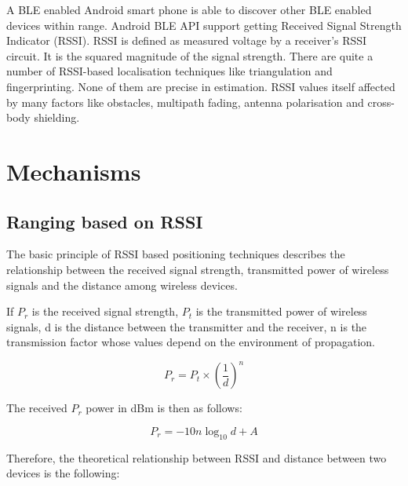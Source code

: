 \documentclass[conference,a4paper]{../../sty/IEEEtran}
\begin{document}
A BLE enabled Android smart phone is able to discover other BLE enabled devices within range.
Android BLE API support getting Received Signal Strength Indicator (RSSI).
RSSI is defined as measured voltage by a receiver’s RSSI circuit.
It is the squared magnitude of the signal strength.
There are quite a number of RSSI-based localisation techniques like triangulation and fingerprinting.
None of them are precise in estimation.
RSSI values itself affected by many factors like obstacles, multipath fading, antenna polarisation and cross-body shielding.
 
\section{Mechanisms}

\subsection{Ranging based on RSSI}


The basic principle of RSSI based positioning techniques describes the relationship between the received signal strength, transmitted power of wireless signals and the distance among wireless devices.

If $P_{r}$ is the received signal strength, $P_{t}$ is the transmitted power of wireless 
signals, d is the distance between the transmitter and the receiver, n is the transmission factor whose values depend on the environment of propagation. \cite{xu2010distance}

\begin{equation}
  P_{r} = P_{t} \times (\frac{1}{d})^{n}
 \label{eq1}
\end{equation}

The received $P_{r}$ power in dBm is then as follows:

\begin{equation}
  P_{r} =-10n \log_{10}d + A
 \label{eq2}
\end{equation}

Therefore, the theoretical relationship between RSSI and distance between two devices is the following: \cite{chung2007enhanced}
\end{document}
